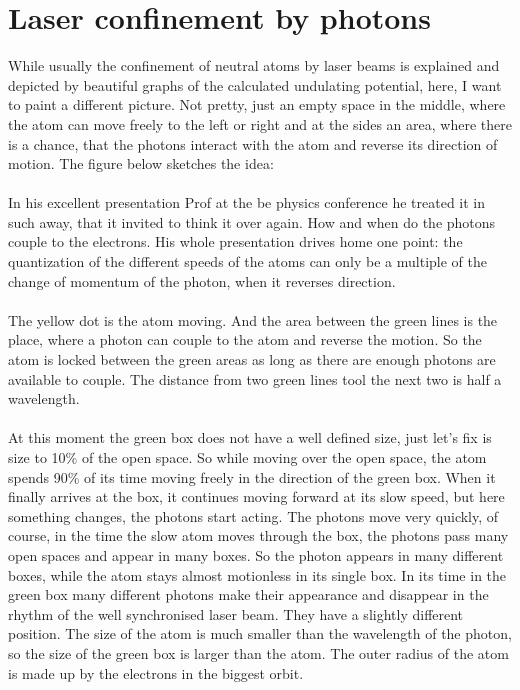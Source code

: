 
\section{Laser confinement by photons}

While usually the confinement of neutral atoms by laser beams is explained and depicted by beautiful graphs of the calculated undulating potential, here, I want to paint a different picture. Not pretty, just an empty space in the middle, where the atom can move freely to the left or right and at the sides an area, where there is a chance, that the photons interact with the atom and reverse its direction of motion. The figure below sketches the idea:


\paragraph{}
In his excellent presentation Prof at the be physics conference he treated it in such away, that it invited to think it over again. How and when do the photons couple to the electrons. His whole presentation drives home one point: the quantization of the different speeds of the atoms can only be a multiple of the change of momentum of the photon, when it reverses direction.




\paragraph{}
The yellow dot is the atom moving. And the area between the green lines is the place, where a photon can couple to the atom and reverse the motion. So the atom is locked between the green areas as long as there are enough photons are available to couple. The distance from two green lines tool the next two is half a wavelength.
\paragraph{}
At this moment the green box does not have a well defined size, just let's fix is size to 10\% of the open space. So while moving over the open space, the atom spends 90\% of its time moving freely in the direction of the green box. When it finally arrives at the box, it continues moving forward at its slow speed, but here something changes, the photons start acting. The photons move very quickly, of course, in the time the slow atom moves through the box, the photons pass many open spaces and appear in many boxes. So the photon appears in many different boxes, while the atom stays almost motionless in its single box. In its time in the green box many different photons make their appearance and disappear in the rhythm of the well synchronised laser beam. They have a slightly different position. The size of the atom is much smaller than the wavelength of the photon, so the size of the green box is larger than the atom. The outer radius of the atom is made up by the electrons in the biggest orbit.

